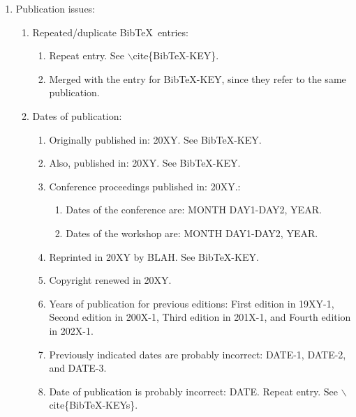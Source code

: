 \documentclass[letter,12pt]{article}
\begin{document}
\begin{enumerate}
\begin{enumerate}
\begin{enumerate}
		\end{enumerate}
	\item Editors of the book: BLAH-1 and BLAH-2.
	\item Editors of conference proceedings: BLAH-1, BLAH-2, and BLAH-3.
	\item Series editors: BLAH-1 and BLAH-2.
	\end{enumerate}
\item Publication issues: \vspace{-0.3cm}
	\begin{enumerate} \itemsep -2pt
	\item Repeated/duplicate {\sc Bib}\TeX\ entries: \vspace{-0.2cm}
		\begin{enumerate} \itemsep -2pt
		\item Repeat entry. See $\backslash$cite\{BibTeX-KEY\}.
		\item Merged with the entry for BibTeX-KEY, since they refer to the same publication.
		\end{enumerate}
	\item Dates of publication: \vspace{-0.2cm}
		\begin{enumerate} \itemsep -2pt
		\item Originally published in: 20XY. See BibTeX-KEY.
		\item Also, published in: 20XY. See BibTeX-KEY.
		\item Conference proceedings published in: 20XY.: \vspace{-0.1cm}
			\begin{enumerate} \itemsep -1pt
			\item Dates of the conference are: MONTH DAY1-DAY2, YEAR.
			\item Dates of the workshop are: MONTH DAY1-DAY2, YEAR.
			\end{enumerate}
		\item Reprinted in 20XY by BLAH. See BibTeX-KEY.
		\item Copyright renewed in 20XY.
		\item Years of publication for previous editions: First edition in 19XY-1, Second edition in 200X-1, Third edition in 201X-1, and Fourth edition in 202X-1.
		\item Previously indicated dates are probably incorrect: DATE-1, DATE-2, and DATE-3.
		\item Date of publication is probably incorrect: DATE. Repeat entry. See $\backslash$cite\{BibTeX-KEYs\}.

\end{enumerate}
\end{enumerate}
\end{enumerate}
\end{document}
